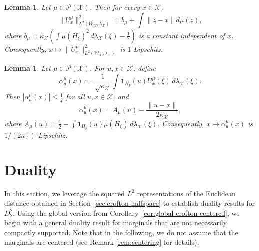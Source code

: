 \documentclass[11pt]{amsart}
\newtheorem{lemma}[theorem]{Lemma}
\theoremstyle{definition}
\theoremstyle{remark}
\newcommand{\cP}{\mathcal{P}}
\newcommand{\1}{\mathbf{1}}
\numberwithin{equation}{section}
\begin{document}
\begin{lemma}\label{lem:linear-distance}
Let $\mu\in\cP(\mathcal X)$. Then for every $x\in \mathcal{X}$,
\begin{equation}\label{eq:linear U}
\|U_x^\mu\|_{L^2(\mathcal{W}_\mathcal{X},\lambda_\mathcal{X})}^2=b_\mu+\int \|z-x\|d\mu(z),
\end{equation}
where $b_\mu =
\kappa_{\mathcal X}
\left(
\int\mu(H_\xi)^2\,d\lambda_{\mathcal X}(\xi)-\frac12
\right)$ is a constant independent of $x$.
Consequently, $x\mapsto \|U_x^\mu\|^{2}_{L^2(\mathcal{W}_\mathcal{X},\lambda_{\mathcal{X}})}$ is $1$-Lipschitz.

\end{lemma}

\begin{lemma}\label{lem:linear-distance-y}
Let $\mu\in\cP(\mathcal X)$. For $u,x\in\mathcal X$, define
\[
\alpha_u^\mu(x)
:=
\frac{1}{\sqrt{\kappa_{\mathcal X}}}
\int\1_{H_\xi}(u)U_x^\mu(\xi)\,d\lambda_{\mathcal X}(\xi).
\]
Then $|\alpha_u^\mu(x)|\leq\frac12$ for all $u,x\in\mathcal X$, and
\begin{equation}\label{eq:linear-alpha}
\alpha_u^\mu(x)
=
A_\mu(u)-\frac{\|u-x\|}{2\kappa_{\mathcal X}},
\end{equation}
where
$A_\mu(u)
=
\frac12-\int\1_{H_\xi}(u)\mu(H_\xi)\,d\lambda_{\mathcal X}(\xi).
$
Consequently, $x\mapsto \alpha_u^\mu(x)$ is
$1/(2\kappa_{\mathcal X})$-Lipschitz.
\end{lemma}


\section{Duality} \label{sec:duality}

In this section, we leverage the squared $L^2$ representations of the
Euclidean distance obtained in Section~\ref{sec:crofton-halfspace} to
establish duality results for $D_2^2$. Using the global version from Corollary~\ref{cor:global-crofton-centered}, we begin
with a general duality result for marginals that are not necessarily
compactly supported. Note that in the following, we do not assume
that the marginals are centered (see Remark \ref{rem:centering} for details).
\end{document}
